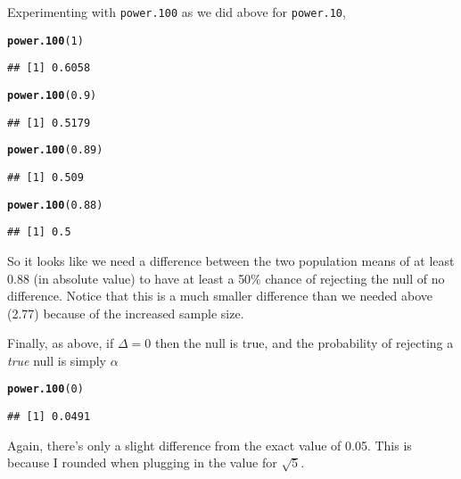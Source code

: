 \documentclass[addpoints,12pt]{exam}\usepackage[]{graphicx}\usepackage[]{color}
\makeatletter
\newcommand{\hlnum}[1]{\textcolor[rgb]{0.686,0.059,0.569}{#1}}%
\newcommand{\hlstd}[1]{\textcolor[rgb]{0.345,0.345,0.345}{#1}}%
\newcommand{\hlkwd}[1]{\textcolor[rgb]{0.737,0.353,0.396}{\textbf{#1}}}%
\newenvironment{kframe}{%
 \def\at@end@of@kframe{}%
 \ifinner\ifhmode%
  \def\at@end@of@kframe{\end{minipage}}%
  \begin{minipage}{\columnwidth}%
 \fi\fi%
 \def\FrameCommand##1{\hskip\@totalleftmargin \hskip-\fboxsep
 \colorbox{shadecolor}{##1}\hskip-\fboxsep
     \hskip-\linewidth \hskip-\@totalleftmargin \hskip\columnwidth}%
 \MakeFramed {\advance\hsize-\width
   \@totalleftmargin\z@ \linewidth\hsize
   \@setminipage}}%
 {\par\unskip\endMakeFramed%
 \at@end@of@kframe}
\newenvironment{knitrout}{}{} %
\makeatother
\begin{document}
\begin{questions}
\begin{parts}
\begin{solution}
Experimenting with \texttt{power.100} as we did above for \texttt{power.10}, 
\begin{knitrout}
\color{fgcolor}\begin{kframe}
\begin{alltt}
\hlkwd{power.100}\hlstd{(}\hlnum{1}\hlstd{)}
\end{alltt}
\begin{verbatim}
## [1] 0.6058
\end{verbatim}
\begin{alltt}
\hlkwd{power.100}\hlstd{(}\hlnum{0.9}\hlstd{)}
\end{alltt}
\begin{verbatim}
## [1] 0.5179
\end{verbatim}
\begin{alltt}
\hlkwd{power.100}\hlstd{(}\hlnum{0.89}\hlstd{)}
\end{alltt}
\begin{verbatim}
## [1] 0.509
\end{verbatim}
\begin{alltt}
\hlkwd{power.100}\hlstd{(}\hlnum{0.88}\hlstd{)}
\end{alltt}
\begin{verbatim}
## [1] 0.5
\end{verbatim}
\end{kframe}
\end{knitrout}
So it looks like we need a difference between the two population means of at least 0.88 (in absolute value) to have at least a 50\% chance of rejecting the null of no difference. Notice that this is a much smaller difference than we needed above (2.77) because of the increased sample size. 

Finally, as above, if $\Delta = 0$ then the null is true, and the probability of rejecting a \emph{true} null is simply $\alpha$
\begin{knitrout}
\color{fgcolor}\begin{kframe}
\begin{alltt}
\hlkwd{power.100}\hlstd{(}\hlnum{0}\hlstd{)}
\end{alltt}
\begin{verbatim}
## [1] 0.0491
\end{verbatim}
\end{kframe}
\end{knitrout}
Again, there's only a slight difference from the exact value of 0.05. This is because I rounded when plugging in the value for $\sqrt{5}$.
        \end{solution}
	\end{parts}



\end{questions}
\end{document}
